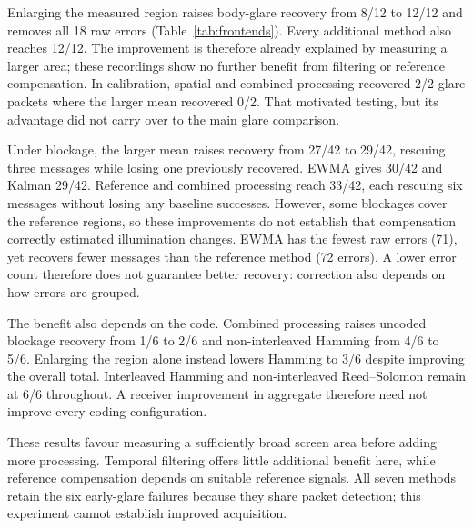 Enlarging the measured region raises body-glare recovery from 8/12 to
12/12 and removes all 18 raw errors (Table~\ref{tab:frontends}). Every
additional method also reaches 12/12. The improvement is therefore already
explained by measuring a larger area; these recordings show no further
benefit from filtering or reference compensation. In calibration, spatial
and combined processing recovered 2/2 glare packets where the larger mean
recovered 0/2. That motivated testing, but its advantage did not carry over
to the main glare comparison.

Under blockage, the larger mean raises recovery from 27/42 to 29/42,
rescuing three messages while losing one previously recovered. EWMA gives
30/42 and Kalman 29/42. Reference and combined processing reach 33/42,
each rescuing six messages without losing any baseline successes.
However, some blockages cover the reference regions, so these improvements
do not establish that compensation correctly estimated illumination changes.
EWMA has the fewest raw errors (71), yet recovers fewer messages than the
reference method (72 errors). A lower error count therefore does not
guarantee better recovery: correction also depends on how errors are grouped.

The benefit also depends on the code. Combined processing raises uncoded
blockage recovery from 1/6 to 2/6 and non-interleaved Hamming from 4/6 to
5/6. Enlarging the region alone instead lowers Hamming to 3/6 despite
improving the overall total. Interleaved Hamming and non-interleaved
Reed--Solomon remain at 6/6 throughout. A receiver improvement in aggregate
therefore need not improve every coding configuration.

These results favour measuring a sufficiently broad screen area before
adding more processing. Temporal filtering offers little additional benefit
here, while reference compensation depends on suitable reference signals.
All seven methods retain the six early-glare failures because they share
packet detection; this experiment cannot establish improved acquisition.
